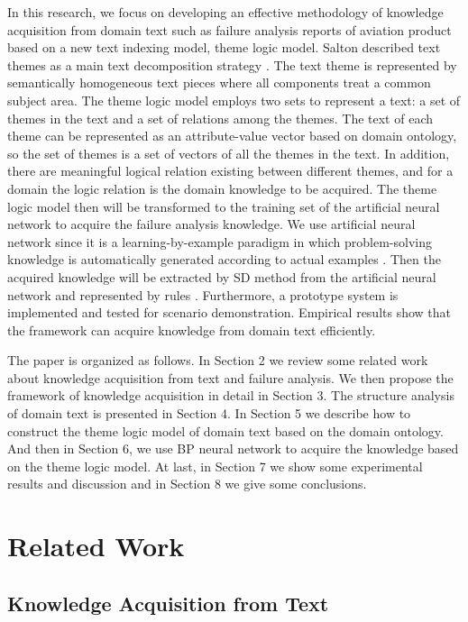 \documentclass{elsarticle}
\begin{document}
In this research, we focus on developing an effective methodology of
knowledge acquisition from domain text such as failure analysis
reports of aviation product based on a new text indexing model, theme
logic model. Salton described text themes as a main text decomposition
strategy \cite{234834}. The text theme is represented by semantically
homogeneous text pieces where all components treat a common subject
area. The theme logic model employs two sets to represent a text: a
set of themes in the text and a set of relations among the themes. The
text of each theme can be represented as an attribute-value vector
based on domain ontology, so the set of themes is a set of vectors of
all the themes in the text. In addition, there are meaningful logical
relation existing between different themes, and for a domain the logic
relation is the domain knowledge to be acquired. The theme logic model
then will be transformed to the training set of the artificial neural
network to acquire the failure analysis knowledge. We use  artificial
neural network since it is a learning-by-example paradigm in which
problem-solving knowledge is automatically generated according to
actual examples \cite{Huang2002,Kim2004}. Then the acquired knowledge  will be extracted by SD method from the artificial neural network and represented by rules \cite{130346,Sestito1991}. Furthermore, a prototype system is implemented and tested for scenario demonstration. Empirical results show that the framework can acquire knowledge from domain text efficiently.

The paper is organized as follows. In Section 2 we review some related work about knowledge acquisition from text and failure analysis. We then propose the framework of knowledge acquisition in detail in Section 3. The structure analysis of domain text is presented in Section 4. In Section 5 we describe how to construct the theme logic model of domain text based on the domain ontology. And then in Section 6, we use BP neural network to acquire the knowledge based on the theme logic model. At last, in Section 7 we show some experimental results and discussion and in Section 8 we give some conclusions. 

\section{Related Work
}
\label{sec:related-work}

\subsection{Knowledge Acquisition from Text
}
\label{sec:knowl-acqu-from}
\end{document}
